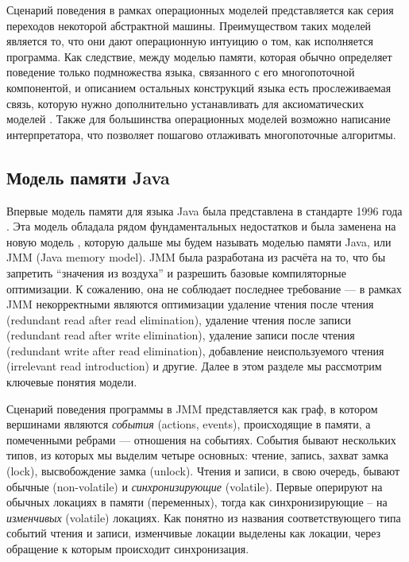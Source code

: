 Сценарий поведения в рамках операционных моделей представляется как
серия переходов некоторой абстрактной машины.
Преимуществом таких моделей является то, что они дают операционную интуицию о том, как исполняется программа.
Как следствие, между моделью памяти, которая обычно определяет поведение только подмножества языка, связанного с его многопоточной
компонентой, и описанием остальных конструкций языка есть прослеживаемая связь, которую нужно дополнительно
устанавливать для аксиоматических моделей \cite{Memarian-al:PLDI16}.
Также для большинства операционных моделей возможно написание интерпретатора, что позволяет пошагово
отлаживать многопоточные алгоритмы.


\subsection{Модель памяти Java}
Впервые модель памяти для языка Java была представлена в стандарте 1996 года \cite{Gosling-al:BOOK96}.
Эта модель обладала рядом фундаментальных недостатков \cite{Pugh:JAVA99,Pugh:CPE00} и была заменена на
новую модель \cite{Manson-al:POPL05}, которую дальше мы будем называть моделью памяти Java, или JMM (Java memory model).
JMM была разработана из расчёта на то, что бы запретить ``значения из воздуха'' и разрешить базовые компиляторные оптимизации.
К сожалению, она не соблюдает последнее требование \cite{Sevcik-Aspinall:ECOOP08} ---
в рамках JMM некорректными являются оптимизации удаление чтения после чтения (redundant read after read elimination),
удаление чтения после записи (redundant read after write elimination),
удаление записи после чтения (redundant write after read elimination),
добавление неиспользуемого чтения (irrelevant read introduction) и другие.
Далее в этом разделе мы рассмотрим ключевые понятия модели.

Сценарий поведения программы в JMM представляется как граф, в котором вершинами
являются \emph{события} (actions, events), происходящие в памяти, а помеченными ребрами ---
отношения на событиях.
События бывают нескольких типов, из которых мы выделим четыре основных:
чтение, запись, захват замка (lock), высвобождение замка (unlock).
Чтения и записи, в свою очередь, бывают обычные (non-volatile) и \emph{синхронизирующие} (volatile).
Первые оперируют на обычных локациях в памяти (переменных), тогда как синхронизирующие -- на
\emph{изменчивых} (volatile) локациях.
Как понятно из названия соответствующего типа событий чтения и записи, изменчивые локации выделены как
локации, через обращение к которым происходит синхронизация.

